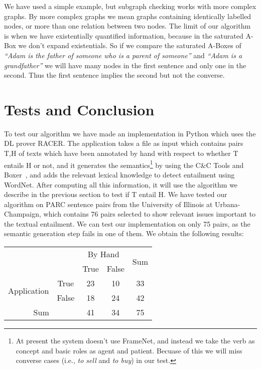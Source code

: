 \documentclass{esslli}
\begin{document}
We have used a simple example, but subgraph checking works with more
complex graphs. By more complex graphs we mean graphs containing
identically labelled nodes, or more than one relation between two
nodes. The limit of our algorithm is when we have existentially
quantified information, because in the saturated A-Box we don't expand
existentials. So if we compare the saturated A-Boxes of \emph{``Adam
is the father of someone who is a parent of someone''} and
\emph{``Adam is a grandfather''} we will have many nodes in the first
sentence and only one in the second. Thus the first sentence implies
the second but not the converse.

\section{Tests and Conclusion}
To test our algorithm we have made an implementation in Python which
uses the DL prover RACER. The application takes a file as input which
contains pairs T,H of texts which have been annotated by hand with
respect to whether T entails H or not, and it generates the
semantics\footnote{At present the system doesn't use FrameNet, and
instead we take the verb as concept and basic roles as agent and
patient. Becuase of this we will miss converse cases (i.e., \emph{to sell}
and \emph{to buy}) in our test.} by using the C\&C Tools and Boxer~\cite{cctb}, and adds
the relevant lexical knowledge to detect entailment using
WordNet. After computing all this information, it will use the
algorithm we describe in the previous section to test if T entail H.
We have tested our algorithm on PARC sentence pairs from the
University of Illinois at Urbana-Champaign, which contains 76 pairs
selected to show relevant issues important to the textual entailment.
We can test our implementation on only 75 pairs, as the semantic
generation step fails in one of them. We obtain the following
results:
\begin{center}
 \begin{tabular}{|c|c|c|c|c|}\cline{3-5}
  \multicolumn{2}{c|}{} & \multicolumn{2}{c|}{By Hand} & \multirow{2}{7mm}{Sum} \\\cline{3-4}
  \multicolumn{2}{c|}{}& True & False & \\\hline
  \multirow{2}{20mm}{Application} & True & 23 & 10 & 33 \\\cline{2-5}
   & False & 18 & 24 & 42 \\\hline
  \multicolumn{2}{|c|}{Sum} & 41 & 34 & 75 \\\hline
 \end{tabular}
\end{center}
\end{document}
